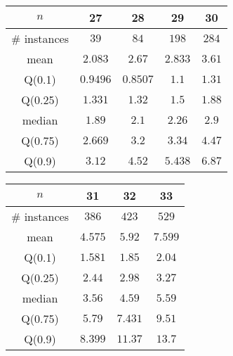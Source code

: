 \begin{tabular}{c|cccc} 
\hline 
$n$ & 27 & 28 & 29 & 30 \tabularnewline 
\hline 
\hline 
\# instances & $39$ & $84$ & $198$ & $284$ \tabularnewline 
mean & $2.083$ & $2.67$ & $2.833$ & $3.61$ \tabularnewline 
Q(0.1) & $0.9496$ & $0.8507$ & $1.1$ & $1.31$ \tabularnewline 
Q(0.25) & $1.331$ & $1.32$ & $1.5$ & $1.88$ \tabularnewline 
median & $1.89$ & $2.1$ & $2.26$ & $2.9$ \tabularnewline 
Q(0.75) & $2.669$ & $3.2$ & $3.34$ & $4.47$ \tabularnewline 
Q(0.9) & $3.12$ & $4.52$ & $5.438$ & $6.87$ \tabularnewline 
\hline 
\end{tabular} 
\medskip{} 

\begin{tabular}{c|ccc} 
\hline 
$n$ & 31 & 32 & 33 \tabularnewline 
\hline 
\hline 
\# instances & $386$ & $423$ & $529$ \tabularnewline 
mean & $4.575$ & $5.92$ & $7.599$ \tabularnewline 
Q(0.1) & $1.581$ & $1.85$ & $2.04$ \tabularnewline 
Q(0.25) & $2.44$ & $2.98$ & $3.27$ \tabularnewline 
median & $3.56$ & $4.59$ & $5.59$ \tabularnewline 
Q(0.75) & $5.79$ & $7.431$ & $9.51$ \tabularnewline 
Q(0.9) & $8.399$ & $11.37$ & $13.7$ \tabularnewline 
\hline 
\end{tabular} 
\medskip{} 

